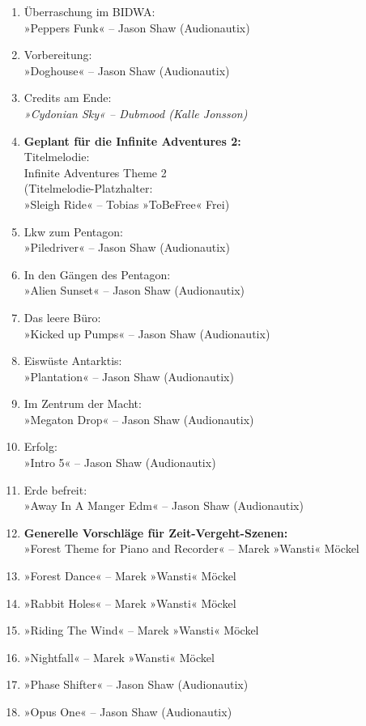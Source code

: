\begin{enumerate}
    \item Überraschung im BIDWA:\\ »Peppers Funk« – Jason Shaw (Audionautix)
    \item Vorbereitung:\\ »Doghouse« – Jason Shaw (Audionautix)
    \item Credits am Ende:\\ \textit{»Cydonian Sky« – Dubmood (Kalle Jonsson)}
    \item \textbf{Geplant für die Infinite Adventures 2:}\\ Titelmelodie:\\ Infinite Adventures Theme 2\\(Titelmelodie-Platzhalter:\\ »Sleigh Ride« – Tobias »ToBeFree« Frei)
    \item Lkw zum Pentagon:\\ »Piledriver« – Jason Shaw (Audionautix) 
    \item In den Gängen des Pentagon:\\ »Alien Sunset« – Jason Shaw (Audionautix)
    \item Das leere Büro:\\ »Kicked up Pumps« – Jason Shaw (Audionautix)
    \item Eiswüste Antarktis:\\ »Plantation« – Jason Shaw (Audionautix)
    \item Im Zentrum der Macht:\\ »Megaton Drop« – Jason Shaw (Audionautix)
    \item Erfolg:\\ »Intro 5« – Jason Shaw (Audionautix)
    \item Erde befreit:\\ »Away In A Manger Edm« – Jason Shaw (Audionautix)
    \item \textbf{Generelle Vorschläge für Zeit-Vergeht-Szenen:}\\ »Forest Theme for Piano and Recorder« – Marek »Wansti« Möckel
    \item »Forest Dance« – Marek »Wansti« Möckel
    \item »Rabbit Holes« – Marek »Wansti« Möckel
    \item »Riding The Wind« – Marek »Wansti« Möckel
    \item »Nightfall« – Marek »Wansti« Möckel
    \item »Phase Shifter« – Jason Shaw (Audionautix)
    \item »Opus One« – Jason Shaw (Audionautix)

\end{enumerate}
